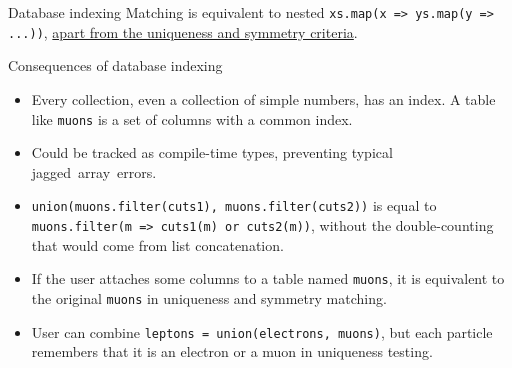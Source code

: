 \documentclass[aspectratio=169]{beamer}
\begin{document}
\begin{frame}[fragile]{Database indexing}
\large
\vspace{0.5 cm}
Matching is equivalent to nested \texttt{xs.map(x => ys.map(y => ...))}, \underline{apart from the uniqueness and symmetry criteria}.

\vspace{1 cm}

\vspace{1 cm}
\end{frame}

\begin{frame}{Consequences of database indexing}
\large
\vspace{0.25 cm}
\begin{itemize}\setlength{\itemsep}{0.25 cm}
\item Every collection, even a collection of simple numbers, has an index. A table like \texttt{muons} is a set of columns with a common index.

\item<2-> Could be tracked as compile-time types, preventing typical \mbox{jagged array errors.\hspace{-1 cm}}

\item<3-> \texttt{union(muons.filter(cuts1), muons.filter(cuts2))} is equal to \texttt{muons.filter(m => cuts1(m) or cuts2(m))}, without the double-counting that would come from list concatenation.

\item<4-> If the user attaches some columns to a table named \texttt{muons}, it is equivalent to the original \texttt{muons} in uniqueness and symmetry matching.

\item<5-> User can combine \texttt{leptons = union(electrons, muons)}, but each particle remembers that it is an electron or a muon in uniqueness testing.
\end{itemize}

\vspace{0.25 cm}
\end{frame}
\end{document}
